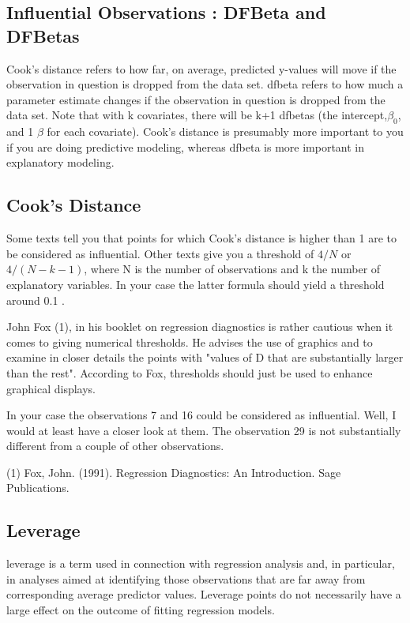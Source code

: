 \documentclass[Chap5amain.tex]{subfiles}
\begin{document}
\subsection{Influential Observations : DFBeta and DFBetas}
Cook's distance refers to how far, on average, predicted y-values will move if the observation in question is dropped from the data set. dfbeta refers to how much a parameter estimate changes if the observation in question is dropped from the data set. Note that with k covariates, there will be k+1 dfbetas (the intercept,$\beta_0$, and 1 $\beta$ for each covariate). Cook's distance is presumably more important to you if you are doing predictive modeling, whereas dfbeta is more important in explanatory modeling.

\subsection{Cook's Distance}
Some texts tell you that points for which Cook's distance is higher than 1 are to be considered as influential. Other texts give you a threshold of $4/N$ or $4/(N−k−1)$, where N is the number of observations and k the number of explanatory variables. In your case the latter formula should yield a threshold around 0.1 .

John Fox (1), in his booklet on regression diagnostics is rather cautious when it comes to giving numerical thresholds. He advises the use of graphics and to examine in closer details the points with "values of D that are substantially larger than the rest". According to Fox, thresholds should just be used to enhance graphical displays.

In your case the observations 7 and 16 could be considered as influential. Well, I would at least have a closer look at them. The observation 29 is not substantially different from a couple of other observations.

(1) Fox, John. (1991). Regression Diagnostics: An Introduction. Sage Publications.
\subsection{Leverage}
 leverage is a term used in connection with regression analysis and, in particular, in analyses aimed at identifying those observations that are far away from corresponding average predictor values. Leverage points do not necessarily have a large effect on the outcome of fitting regression models.
\end{document}
